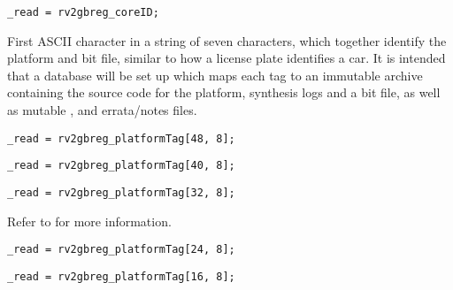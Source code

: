 \reset{********}
\implementation{}
\begin{lstlisting}
_read = rv2gbreg_coreID;
\end{lstlisting}

First ASCII character in a string of seven characters, which together identify 
the platform and bit file, similar to how a license plate identifies a car. It 
is intended that a database will be set up which maps each tag to an immutable 
archive containing the source code for the platform, synthesis logs and a bit 
file, as well as mutable ,  and errata/notes 
files.

\implementation{}
\begin{lstlisting}
_read = rv2gbreg_platformTag[48, 8];
\end{lstlisting}

\implementation{}
\begin{lstlisting}
_read = rv2gbreg_platformTag[40, 8];
\end{lstlisting}

\implementation{}
\begin{lstlisting}
_read = rv2gbreg_platformTag[32, 8];
\end{lstlisting}


Refer to  for more information.

\implementation{}
\begin{lstlisting}
_read = rv2gbreg_platformTag[24, 8];
\end{lstlisting}

\implementation{}
\begin{lstlisting}
_read = rv2gbreg_platformTag[16, 8];
\end{lstlisting}

